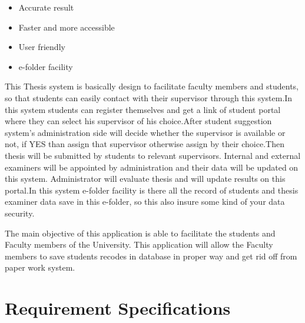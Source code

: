	\begin{itemize}
		\item Accurate result
	\item Faster and more accessible
	\item User friendly
	\item e-folder facility
	\end{itemize}
	
This Thesis system is basically design to facilitate faculty members and students, so that students can easily contact with their supervisor through this system.In this system students can register themselves and get a link of student portal where they can select his supervisor of his choice.After student suggestion system's administration side will decide whether the supervisor is available or not, if YES than assign that supervisor otherwise assign by their choice.Then thesis will be submitted by students to relevant supervisors. Internal and external examiners will be appointed by administration and their data will be updated on this system. Administrator will evaluate thesis and will update results on this portal.In this system e-folder facility is there all the record of students and thesis examiner data save in this e-folder, so this also insure some kind of your data security. 
\par The main objective of this application is able to facilitate the students and Faculty members  of the University. This application will allow the Faculty members to save students recodes in database in proper way and get rid off from paper work system.
	
	\section{Requirement Specifications}
	
